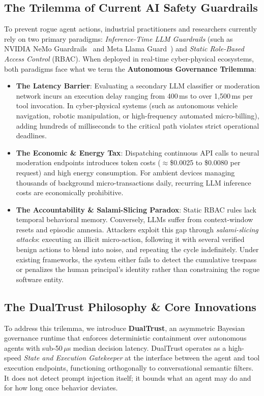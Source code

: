 \documentclass[journal]{IEEEtran}
\begin{document}
\subsection{The Trilemma of Current AI Safety Guardrails}
To prevent rogue agent actions, industrial practitioners and researchers currently rely on two primary paradigms: \emph{Inference-Time LLM Guardrails} (such as NVIDIA NeMo Guardrails~\cite{rebedea2023nemo} and Meta Llama Guard~\cite{inan2023llama}) and \emph{Static Role-Based Access Control} (RBAC). When deployed in real-time cyber-physical ecosystems, both paradigms face what we term the \textbf{Autonomous Governance Trilemma}:
\begin{itemize}[leftmargin=12pt, topsep=2pt, itemsep=1pt]
\item \textbf{The Latency Barrier}: Evaluating a secondary LLM classifier or moderation network incurs an execution delay ranging from 400\,ms to over 1,500\,ms per tool invocation. In cyber-physical systems (such as autonomous vehicle navigation, robotic manipulation, or high-frequency automated micro-billing), adding hundreds of milliseconds to the critical path violates strict operational deadlines.
\item \textbf{The Economic \& Energy Tax}: Dispatching continuous API calls to neural moderation endpoints introduces token costs ($\approx$\$0.0025 to \$0.0080 per request) and high energy consumption. For ambient devices managing thousands of background micro-transactions daily, recurring LLM inference costs are economically prohibitive.
\item \textbf{The Accountability \& Salami-Slicing Paradox}: Static RBAC rules lack temporal behavioral memory. Conversely, LLMs suffer from context-window resets and episodic amnesia. Attackers exploit this gap through \emph{salami-slicing attacks}: executing an illicit micro-action, following it with several verified benign actions to blend into noise, and repeating the cycle indefinitely. Under existing frameworks, the system either fails to detect the cumulative trespass or penalizes the human principal's identity rather than constraining the rogue software entity.
\end{itemize}

\subsection{The DualTrust Philosophy \& Core Innovations}
To address this trilemma, we introduce \textbf{DualTrust}, an asymmetric Bayesian governance runtime that enforces deterministic containment over autonomous agents with sub-50\,$\mu$s median decision latency. DualTrust operates as a high-speed \emph{State and Execution Gatekeeper} at the interface between the agent and tool execution endpoints, functioning orthogonally to conversational semantic filters. It does not detect prompt injection itself; it bounds what an agent may do and for how long once behavior deviates.
\end{document}
